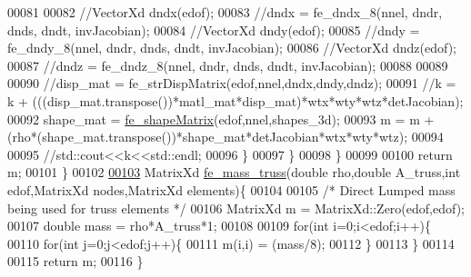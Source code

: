 \begin{DoxyCode}
00081 
00082                 \textcolor{comment}{//VectorXd dndx(edof);}
00083                 \textcolor{comment}{//dndx = fe\_dndx\_8(nnel, dndr, dnds, dndt, invJacobian);}
00084                 \textcolor{comment}{//VectorXd dndy(edof);}
00085                 \textcolor{comment}{//dndy = fe\_dndy\_8(nnel, dndr, dnds, dndt, invJacobian);}
00086                 \textcolor{comment}{//VectorXd dndz(edof);}
00087                 \textcolor{comment}{//dndz = fe\_dndz\_8(nnel, dndr, dnds, dndt, invJacobian);}
00088 
00089 
00090                 \textcolor{comment}{//disp\_mat = fe\_strDispMatrix(edof,nnel,dndx,dndy,dndz);}
00091                 \textcolor{comment}{//k = k + (((disp\_mat.transpose())*matl\_mat*disp\_mat)*wtx*wty*wtz*detJacobian);}
00092                 shape\_mat = \hyperlink{functions_8h_a98fae74dde5fe33a7062e7457a2d3227}{fe\_shapeMatrix}(edof,nnel,shapes\_3d);
00093                 m = m + (rho*(shape\_mat.transpose())*shape\_mat*detJacobian*wtx*wty*wtz);
00094 
00095                 \textcolor{comment}{//std::cout<<k<<std::endl;}
00096             \}
00097         \}
00098     \}
00099 
00100     \textcolor{keywordflow}{return} m;
00101 \}
00102 
\hyperlink{fe__mass__hex_8cpp_a350d27ea0f1de929495d659b26f428d2}{00103} MatrixXd \hyperlink{fe__mass__hex_8cpp_a350d27ea0f1de929495d659b26f428d2}{fe\_mass\_truss}(\textcolor{keywordtype}{double} rho,\textcolor{keywordtype}{double} A\_truss,\textcolor{keywordtype}{int} edof,MatrixXd nodes,MatrixXd elements)\{
00104 
00105     \textcolor{comment}{/* Direct Lumped mass being used for truss elements */}
00106     MatrixXd m = MatrixXd::Zero(edof,edof);
00107     \textcolor{keywordtype}{double} mass = rho*A\_truss*1;
00108 
00109     \textcolor{keywordflow}{for}(\textcolor{keywordtype}{int} i=0;i<edof;i++)\{
00110         \textcolor{keywordflow}{for}(\textcolor{keywordtype}{int} j=0;j<edof;j++)\{
00111             m(i,i) = (mass/8);
00112         \}
00113     \}
00114 
00115     \textcolor{keywordflow}{return} m;
00116 \}
\end{DoxyCode}
